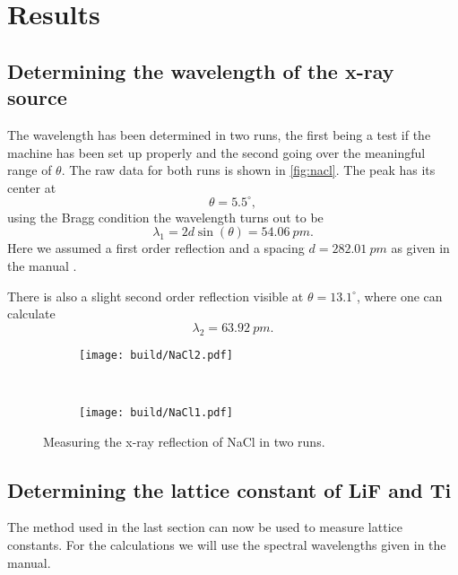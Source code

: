 \section{Results}
\label{sec:results}

\subsection{Determining the wavelength of the x-ray source}
\label{sec:res:wavelength}
The wavelength has been determined in two runs, the first being a test if the machine has been set
up properly and the second going over the meaningful range of $\theta$. The raw data for both runs
is shown in \autoref{fig:nacl}. The peak has its center at
\[
  \theta = 5.5^\circ,
\]
using the Bragg condition the wavelength turns out to be
\begin{equation}
  \lambda_1 = 2d \sin(\theta) = \SI{54.06}{pm}.
\end{equation}
Here we assumed a first order reflection and a spacing $d = \SI{282.01}{pm}$ as given in the manual
\cite{leybold_manual1}.

There is also a slight second order reflection visible at $\theta = 13.1^\circ$, where one can
calculate
\begin{equation}
  \lambda_2 = \SI{63.92}{pm}.
\end{equation}

\begin{figure}
  \centering
  \begin{subfigure}[b]{0.45\textwidth}
    \centering
    \texttt{[image: build/NaCl2.pdf]}
    \label{fig:nacl_calib}
  \end{subfigure}
  \\
  \begin{subfigure}[b]{0.45\textwidth}
    \centering
    \texttt{[image: build/NaCl1.pdf]}
    \label{fig:nacl}
  \end{subfigure}
  \caption{Measuring the x-ray reflection of NaCl in two runs.}
  \label{fig:nacl}
\end{figure}

\subsection{Determining the lattice constant of LiF and Ti}
\label{sec:res:d}
The method used in the last section can now be used to measure lattice constants. For the
calculations we will use the spectral wavelengths given in the manual. 

